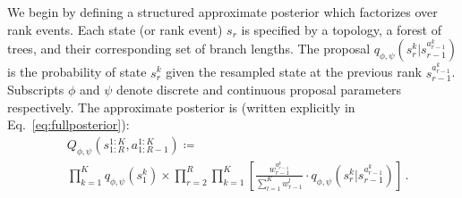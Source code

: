 \documentclass[accepted]{uai2021} %
\theoremstyle{definition}
\begin{document}
We begin by defining a structured approximate posterior which factorizes over rank events. Each state (or rank event) $s_r$ is specified by a topology, a forest of trees, and their corresponding set of branch lengths. The proposal $q_{\phi,\psi}(s_{r}^k|s_{r-1}^{a_{r-1}^k})$ is the probability of state $s_{r}^k$ given the resampled state at the previous rank $s_{r-1}^{a_{r-1}^k}$. Subscripts  $\phi$ and $\psi$ denote discrete and continuous proposal parameters respectively. The approximate posterior  is (written explicitly in Eq.~\ref{eq:fullposterior}):
\begin{align}
     &Q_{\phi,\psi}\left(s_{1:R}^{1:K}, a_{1:R-1}^{1:K}\right)
    \coloneqq   \\ 
    &
    \prod\limits_{k=1}^{K}q_{\phi,\psi}(s_{1}^k)\times %
    \prod\limits_{r=2}^{R}\prod\limits_{k=1}^{K} \left[
    \frac{w_{r-1}^{a_{r-1}^k}}{\sum_{l=1}^K w_{r-1}^l} \cdot
    q_{\phi,\psi}\left(s_{r}^k|s_{r-1}^{a_{r-1}^k}\right)
     \right]
    \, . \nonumber
\end{align}
\end{document}
